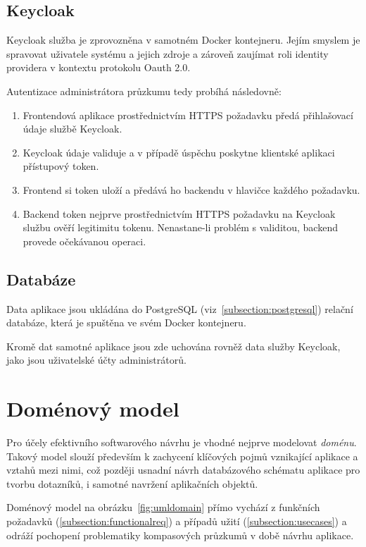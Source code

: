 \subsection{Keycloak}
Keycloak služba je zprovozněna v samotném Docker kontejneru. Jejím smyslem je spravovat
uživatele systému a jejich zdroje a zároveň zaujímat roli identity providera v kontextu
protokolu Oauth 2.0.

Autentizace administrátora průzkumu tedy probíhá následovně:

\begin{enumerate}
    \item Frontendová aplikace prostřednictvím HTTPS požadavku předá přihlašovací údaje službě Keycloak.
    \item Keycloak údaje validuje a v případě úspěchu poskytne klientské aplikaci přístupový token.
    \item Frontend si token uloží a předává ho backendu v hlavičce každého požadavku.
    \item Backend token nejprve prostřednictvím HTTPS požadavku na Keycloak službu ověří legitimitu tokenu. Nenastane-li problém s validitou, backend provede očekávanou operaci.
\end{enumerate}

\subsection{Databáze}
Data aplikace jsou ukládána do PostgreSQL (viz~\ref{subsection:postgresql}) relační databáze, která je spuštěna ve svém Docker kontejneru.

Kromě dat samotné aplikace jsou zde uchována rovněž data služby Keycloak, jako jsou uživatelské účty administrátorů.

\section{Doménový model}
\label{subsection:domain}
Pro účely efektivního softwarového návrhu je vhodné nejprve modelovat \textit{doménu}.
Takový model slouží především k zachycení klíčových pojmů vznikající aplikace a vztahů
mezi nimi, což později usnadní návrh databázového schématu aplikace pro tvorbu dotazníků, i 
samotné navržení aplikačních objektů.

Doménový model na obrázku~\ref{fig:umldomain} přímo vychází z funkčních 
požadavků (\ref{subsection:functionalreq}) a případů užití (\ref{subsection:usecases}) a
odráží pochopení problematiky kompasových průzkumů v době návrhu aplikace.

